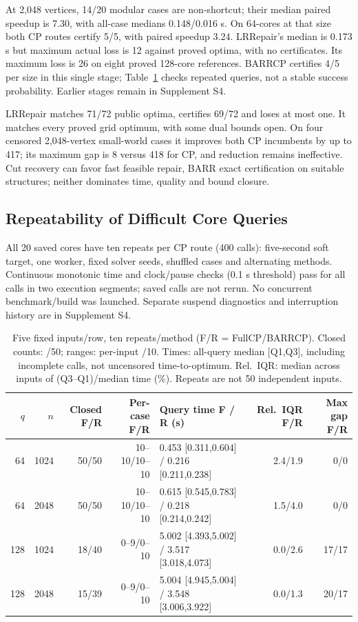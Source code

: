 \documentclass[conference]{IEEEtran}
\begin{document}
At 2,048 vertices, 14/20 modular cases are non-shortcut; their median paired speedup is 7.30, with all-case medians 0.148/0.016 s. On 64-cores at that size both CP routes certify 5/5, with paired speedup 3.24. LRRepair's median is 0.173 s but maximum actual loss is 12 against proved optima, with no certificates. Its maximum loss is 26 on eight proved 128-core references. BARRCP certifies 4/5 per size in this single stage; Table~\ref{tab:repeat} checks repeated queries, not a stable success probability. Earlier stages remain in Supplement S4.

LRRepair matches 71/72 public optima, certifies 69/72 and loses at most one. It matches every proved grid optimum, with some dual bounds open. On four censored 2,048-vertex small-world cases it improves both CP incumbents by up to 417; its maximum gap is 8 versus 418 for CP, and reduction remains ineffective. Cut recovery can favor fast feasible repair, BARR exact certification on suitable structures; neither dominates time, quality and bound closure.


\subsection{Repeatability of Difficult Core Queries}
All 20 saved cores have ten repeats per CP route (400 calls): five-second soft target, one worker, fixed solver seeds, shuffled cases and alternating methods. Continuous monotonic time and clock/pause checks (0.1 s threshold) pass for all calls in two execution segments; saved calls are not rerun. No concurrent benchmark/build was launched. Separate suspend diagnostics and interruption history are in Supplement S4.

\begin{table}[t]
\caption{Five fixed inputs/row, ten repeats/method (F/R = FullCP/BARRCP). Closed counts: /50; ranges: per-input /10. Times: all-query median [Q1,Q3], including incomplete calls, not uncensored time-to-optimum. Rel.~IQR: median across inputs of (Q3--Q1)/median time (\%). Repeats are not 50 independent inputs.}\label{tab:repeat}
\centering\footnotesize\setlength{\tabcolsep}{2pt}
\begin{tabular}{@{}rrrrlrr@{}}
\toprule $q$ & $n$ & Closed F/R & Per-case F/R & Query time F / R (s) & Rel.~IQR F/R & Max gap F/R\\\midrule
64 & 1024 & 50/50 & 10--10/10--10 & 0.453 [0.311,0.604] / 0.216 [0.211,0.238] & 2.4/1.9 & 0/0 \\
64 & 2048 & 50/50 & 10--10/10--10 & 0.615 [0.545,0.783] / 0.218 [0.214,0.242] & 1.5/4.0 & 0/0 \\
128 & 1024 & 18/40 & 0--9/0--10 & 5.002 [4.393,5.002] / 3.517 [3.018,4.073] & 0.0/2.6 & 17/17 \\
128 & 2048 & 15/39 & 0--9/0--10 & 5.004 [4.945,5.004] / 3.548 [3.006,3.922] & 0.0/1.3 & 20/17 \\
\bottomrule\end{tabular}
\end{table}
\end{document}

